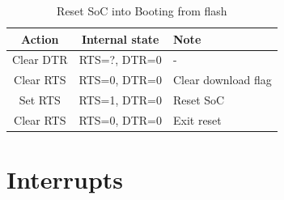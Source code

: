 \documentclass[main\_\_EN.tex]{subfiles}
\begin{document}
\begin{table}[H]
    \centering
    \caption{Reset SoC into Booting from flash}
    \label{tab:usbserialjtag-reset-soc-into-booting}
    \begin{tabular} {|c|c|l|}
    \hline
        \rowcolor{lightgray}
        \textbf{Action} & \textbf{Internal state} & \textbf{Note} \\\hline

        Clear DTR & RTS=?, DTR=0 & - \\\hline
        Clear RTS & RTS=0, DTR=0 &  Clear download flag \\\hline
        Set RTS & RTS=1, DTR=0 & Reset SoC \\\hline
        Clear RTS & RTS=0, DTR=0 & Exit reset \\\hline
    \end{tabular}
\end{table}

\section{Interrupts}
\end{document}
